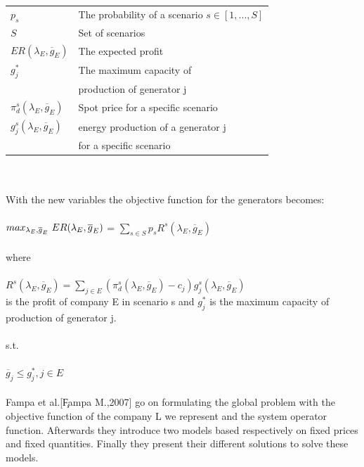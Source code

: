 \documentclass[letterpaper]{article}
\begin{document}
\begin{tabular}{ll}
$p_s$ & The probability of a scenario $s \in [1,...,S]$\\
$S$ & Set of scenarios \\
$ER(\lambda_E,\overline{g}_E)$ & The expected profit\\
$g^*_j$ & The maximum capacity of \\
 & production of generator j \\
$\pi^s_d(\lambda_E,\overline{g}_E)$ & Spot price for a specific scenario\\ 
$g^s_j(\lambda_E,\overline{g}_E)$ & energy production of a generator j \\
& for a specific scenario \\
\end{tabular}\\ \\
With the new variables the objective function for the generators becomes:\\ \\
\(\displaystyle max_{\lambda_E , \overline{g}_E}$ $ER(\lambda_E,\overline{g}_E)\) = \(\displaystyle \sum_{s \in S} p_s R^s (\lambda_E , \overline{g}_E)\)\\ \\
where\\ \\
\(\displaystyle R^s (\lambda_E , \overline{g}_E) = \sum_{j \in E}(\pi_d^s(\lambda_E , \overline{g}_E) - c_j)g_j^s(\lambda_E , \overline{g}_E)\)\\
is the profit of company E in scenario s and $g^*_j$ is the maximum capacity of production of generator j.\\\\
s.t.\\ \\
$\overline{g}_j \leq g^*_j, j \in E$ \\ \\
Fampa et al.[\c{Fampa M.,2007}] go on formulating the global problem  with the objective function of the company L we represent and the system operator function. Afterwards they introduce two models based respectively on fixed prices and fixed quantities.
Finally they present their different solutions to solve these models.
\end{document}
